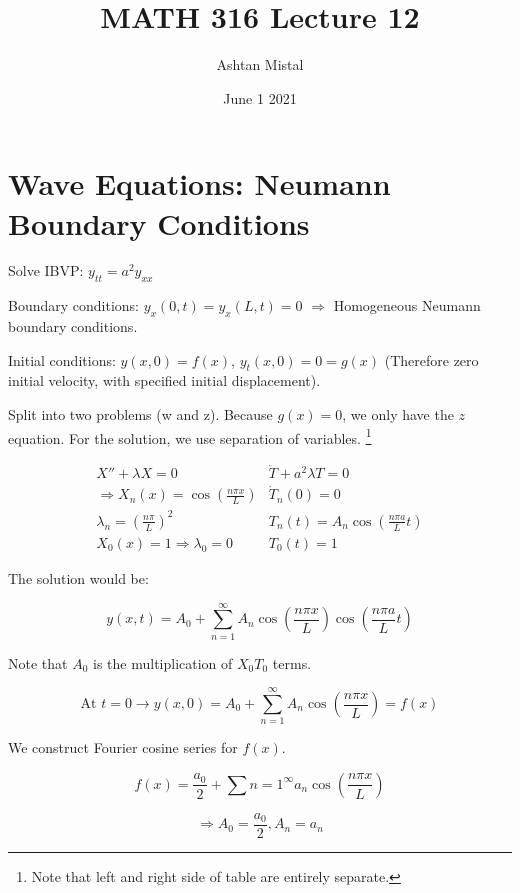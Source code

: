 \documentclass{article}
\title{MATH 316 Lecture 12}
\author{Ashtan Mistal}
\date{June 1 2021}
\begin{document}
\ifstandalone
\maketitle
\fi

\graphicspath{{./Lecture12/}}

\section{Wave Equations: Neumann Boundary Conditions}

Solve IBVP: $y_{tt} = a^2 y_{xx}$

Boundary conditions: $y_x(0,t) = y_x (L,t) = 0$ $\Rightarrow$ Homogeneous Neumann boundary conditions. 

\hfill

Initial conditions: $y(x,0) = f(x)$, $y_t(x,0) = 0 = g(x)$ (Therefore zero initial velocity, with specified initial displacement). 

Split into two problems (w and z). Because $g(x) = 0$, we only have the $z$ equation. For the solution, we use separation of variables. \footnote{Note that left and right side of table are entirely separate. }



$$\begin{array}{l|r}
     X'' + \lambda X = 0 & \ddot T + a^2 \lambda T = 0\\
     \Rightarrow X_n(x) = \cos \left( \frac{n \pi x}{L} \right) & \dot{T}_n (0) = 0 \\
     \lambda_n = \left( \frac{n \pi}{L} \right)^2 & T_n(t) = A_n \cos \left( \frac{n \pi a}{L}  t \right)\\
     X_0(x) = 1 \Rightarrow \lambda_0 = 0 & T_0(t) = 1 
\end{array}$$

The solution would be:

$$y(x,t) = A_0 + \sum_{n = 1}^\infty A_n \cos \left( \frac{n \pi x}{L}  \right) \cos \left( \frac{n \pi a}{L}  t \right)$$

Note that $A_0$ is the multiplication of $X_0 T_0$ terms.

$$\text{At } t = 0 \longrightarrow y(x,0) = A_0 + \sum_{n = 1}^\infty A_n \cos \left( \frac{n \pi x}{L}  \right) = f(x)$$

We construct Fourier cosine series for $f(x)$. 

$$f(x) = \frac{a_0}{2} + \sum{n=  1}^\infty a_n \cos \left( \frac{n \pi x}{L}  \right)$$

$$\Rightarrow A_0 = \frac{a_0}{2}, A_n = a_n$$
\end{document}
